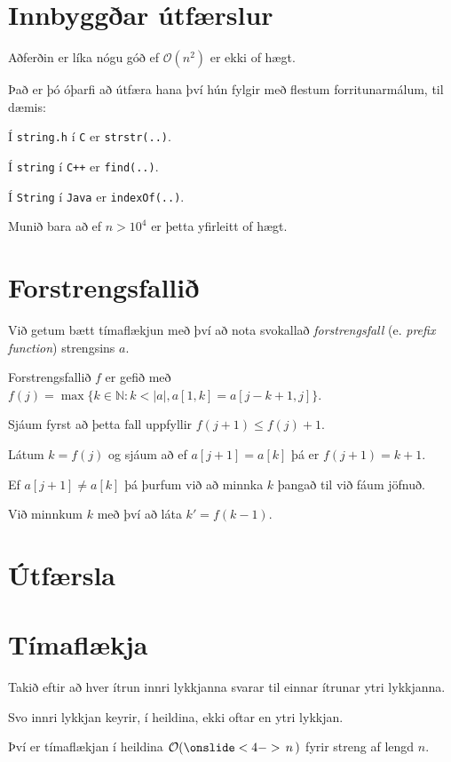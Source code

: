 \section{Innbyggðar útfærslur}
{
    {
        \item<1-> Aðferðin er líka nógu góð ef $\mathcal{O}(n^2)$ er ekki of hægt.
        \item<2-> Það er þó óþarfi að útfæra hana því hún fylgir með flestum forritunarmálum, til dæmis:
        {
            \item<3-> Í \texttt{string.h} í \texttt{C} er \texttt{strstr(..)}.
            \item<4-> Í \texttt{string} í \texttt{C++} er \texttt{find(..)}.
            \item<5-> Í \texttt{String} í \texttt{Java} er \texttt{indexOf(..)}.
        }
        \item<6-> Munið bara að ef $n > 10^4$ er þetta yfirleitt of hægt.
    }
}

\section{Forstrengsfallið}
{
    {
        \item<1-> Við getum bætt tímaflækjun með því að nota svokallað \emph{forstrengsfall} (e. \emph{prefix function}) strengsins $a$.
        \item<2-> Forstrengsfallið $f$ er gefið með $f(j) = \max\{k \in \mathbb{N} \colon k < |a|, a[1,k] = a[j - k + 1, j]\}$.
        \item<3-> Sjáum fyrst að þetta fall uppfyllir $f(j + 1) \leq f(j) + 1$.
        \item<4-> Látum $k = f(j)$ og sjáum að ef $a[j + 1] = a[k]$ þá er $f(j + 1) = k + 1$.
        \item<5-> Ef $a[j + 1] \neq a[k]$ þá þurfum við að minnka $k$ þangað til við fáum jöfnuð.
        \item<6-> Við minnkum $k$ með því að láta $k' = f(k - 1)$.
    }
}

\section{Útfærsla}
{
}

\section{Tímaflækja}
{
    {
        \item<1-> Takið eftir að hver ítrun innri lykkjanna svarar til einnar ítrunar ytri lykkjanna.
        \item<2-> Svo innri lykkjan keyrir, í heildina, ekki oftar en ytri lykkjan.
        \item<3-> Því er tímaflækjan í heildina $\mathcal{O}(\onslide<4->{\,n\,})$ fyrir streng af lengd $n$.
    }
}

